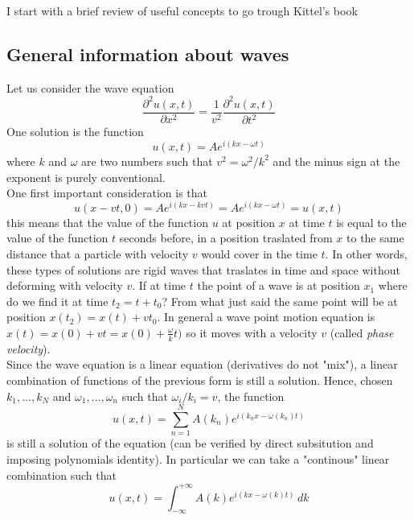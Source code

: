 I start with a brief review of useful concepts to go trough Kittel's book

\subsection*{General information about waves}
Let us consider the wave equation 
\begin{equation*}
    \frac{\partial^2u(x,t)}{\partial x^2} = \frac{1}{v^2} \frac{\partial^2u(x,t)}{\partial t^2}
\end{equation*}
One solution is the function 
\begin{equation*}
    u(x,t) = Ae^{i(kx - \omega t)}
\end{equation*}
where $k$ and $\omega$ are two numbers such that $v^2 = \omega^2 / k^2$ and the minus sign at the exponent is purely conventional. \\
One first important consideration is that 
\begin{equation*}
    u(x-vt,0) = Ae^{i(kx - kvt)} = Ae^{i(kx - \omega t)} = u(x, t)
\end{equation*}
this means that the value of the function $u$ at position $x$ at time $t$ is equal to the value of the function $t$ seconds before, in a position
traslated from $x$ to the same distance that a particle with velocity $v$ would cover in the time $t$. In other words, these types of solutions
are rigid waves that traslates in time and space without deforming with velocity $v$. If at time $t$ the point of a wave is at position $x_1$ where do we find it 
at time $t_2 = t+t_0$? From what just said the same point will be at position $x(t_2) = x(t) + vt_0$. In general a wave point motion equation is $x(t) = x(0) + vt = x(0) + \frac{\omega}{k}t)$ so it moves
with a velocity $v$ (called \emph{phase velocity}). \\ 
Since the wave equation is a linear equation (derivatives do not "mix"), a linear combination of functions of the previous form is 
still a solution. Hence, chosen $k_1, \dots, k_N$ and $\omega_1, \dots, \omega_n$ such that $\omega_i/k_i = v$, the function 
\begin{equation*}
    u(x,t) = \sum_{n=1}^N A(k_n) e^{i(k_nx - \omega(k_n) t)}
\end{equation*}
is still a solution of the equation (can be verified by direct subsitution and imposing polynomials identity).
In particular we can take a "continous" linear combination such that 
\begin{equation}
    u(x,t) = \int_{-\infty}^{+\infty} A(k) e^{i(kx - \omega(k)t)} \, dk
    \label{eq:waves_superposition}
\end{equation}
